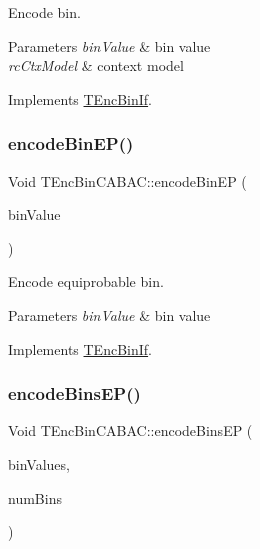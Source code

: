 Encode bin. 


\begin{DoxyParams}{Parameters}
{\em bin\+Value} & bin value \\
\hline
{\em rc\+Ctx\+Model} & context model \\
\hline
\end{DoxyParams}


Implements \hyperlink{class_t_enc_bin_if}{T\+Enc\+Bin\+If}.

\mbox{\label{class_t_enc_bin_c_a_b_a_c_abdd3bfd3c0afb0e39035204ad44116fa}} 
\subsubsection{\texorpdfstring{encode\+Bin\+E\+P()}{encodeBinEP()}}
{\footnotesize\ttfamily Void T\+Enc\+Bin\+C\+A\+B\+A\+C\+::encode\+Bin\+EP (\begin{DoxyParamCaption}\item[{U\+Int}]{bin\+Value }\end{DoxyParamCaption})\hspace{0.3cm}{\ttfamily [virtual]}}



Encode equiprobable bin. 


\begin{DoxyParams}{Parameters}
{\em bin\+Value} & bin value \\
\hline
\end{DoxyParams}


Implements \hyperlink{class_t_enc_bin_if}{T\+Enc\+Bin\+If}.

\mbox{\label{class_t_enc_bin_c_a_b_a_c_ac33859a9a70a2e1c3b7ee15898f59b62}} 
\subsubsection{\texorpdfstring{encode\+Bins\+E\+P()}{encodeBinsEP()}}
{\footnotesize\ttfamily Void T\+Enc\+Bin\+C\+A\+B\+A\+C\+::encode\+Bins\+EP (\begin{DoxyParamCaption}\item[{U\+Int}]{bin\+Values,  }\item[{Int}]{num\+Bins }\end{DoxyParamCaption})\hspace{0.3cm}{\ttfamily [virtual]}}




